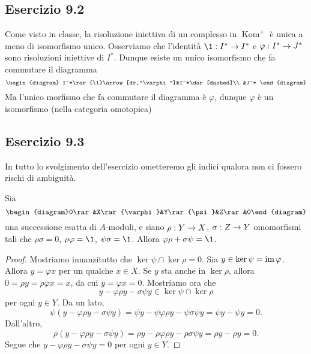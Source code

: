 \documentclass[a4paper]{article}
\DeclareMathOperator{\Kom}{Kom}
\begin{document}
\subsection{Esercizio 9.2}
Come visto in classe, la risoluzione iniettiva di un complesso in $\Kom^+$ è unica a meno di isomorfismo unico. Osserviamo che l'identità $\map{\1}{I^*}{I^*}$ e $\varphi:I^*\rightarrow J^*$ sono risoluzioni iniettive di $I^*$. Dunque esiste un unico isomorfismo che fa commutare il diagramma
$$
\begin{diagram}
I^*\rar{\1}\arrow[dr,"\varphi"]&I^*\dar[dashed]\\
&J^*
\end{diagram}
$$
Ma l'unico morfismo che fa commutare il diagramma è $\varphi$, dunque $\varphi$ è un isomorfismo (nella categoria omotopica)

\subsection*{Esercizio 9.3}
In tutto lo svolgimento dell'esercizio ometteremo gli indici qualora non ci fossero rischi di ambiguità.

\begin{lemma*}
Sia 
$$
\begin{diagram}0\rar&X\rar{\varphi}&Y\rar{\psi}&Z\rar&0\end{diagram}
$$
una successione esatta di $A$-moduli, e siano $\rho:Y\rightarrow X$, $\sigma:Z\rightarrow Y$ omomorfismi tali che $\rho\sigma=0$, $\rho\varphi=\1$, $\psi\sigma=\1$. Allora $\varphi\rho+\sigma\psi=\1$.
\end{lemma*}
\begin{proof}
Mostriamo innanzitutto che $\ker\psi\cap\ker\rho=0$. Sia $y\in\ker\psi=\operatorname{im}\varphi$. Allora $y=\varphi x$ per un qualche $x\in X$. Se $y$ sta anche in $\ker\rho$, allora $0=\rho y=\rho\varphi x=x$, da cui $y=\varphi x=0$. Mostriamo ora che
$$
y-\varphi\rho y-\sigma\psi y\in\ker\psi\cap\ker\rho
$$
per ogni $y\in Y$. Da un lato,
$$
\psi(y-\varphi\rho y-\sigma\psi y)=\psi y-\psi\varphi\rho y-\psi\sigma\psi y=\psi y-\psi y=0.
$$
Dall'altro,
$$
\rho(y-\varphi\rho y-\sigma\psi y)=\rho y-\rho\varphi\rho y-\rho\sigma\psi y=\rho y-\rho y=0.
$$
Segue che $y-\varphi\rho y-\sigma\psi y=0$ per ogni $y\in Y$.
\end{proof}
\end{document}
